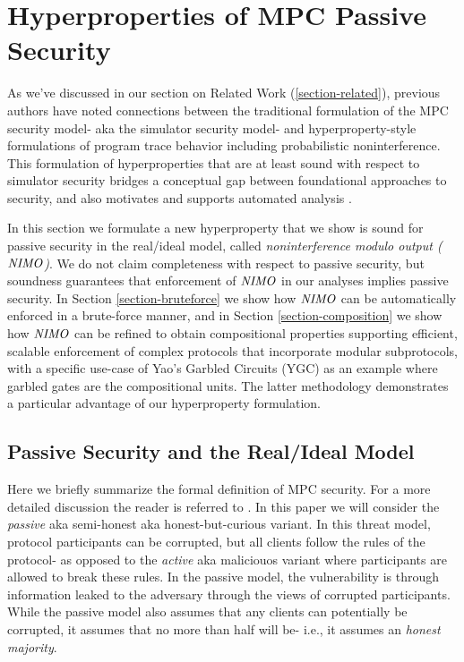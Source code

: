 \section{Hyperproperties of MPC Passive Security}

As we've discussed in our section on Related Work
(\ref{section-related}), previous authors have noted connections
between the traditional formulation of the MPC security model- aka the
simulator security model- and hyperproperty-style formulations of
program trace behavior \cite{XXX} including probabilistic
noninterference. This formulation of hyperproperties that are at least
sound with respect to simulator security bridges a conceptual gap
between foundational approaches to security, and also motivates and
supports automated analysis \cite{XXX}. 

In this section we formulate a new hyperproperty that we show is sound
for passive security in the real/ideal model, called
\emph{noninterference modulo output ($\mathit{NIMO}$)}. We do not claim
completeness with respect to passive security, but soundness
guarantees that enforcement of $\mathit{NIMO}$ in our analyses implies passive
security. In Section \ref{section-bruteforce} we show how $\mathit{NIMO}$ can
be automatically enforced in a brute-force manner, and in Section
\ref{section-composition} we show how $\mathit{NIMO}$ can be refined to obtain
compositional properties supporting efficient, scalable enforcement of
complex protocols that incorporate modular subprotocols, with a
specific use-case of Yao's Garbled Circuits (YGC) as an example where
garbled gates are the compositional units.  The latter methodology
demonstrates a particular advantage of our hyperproperty formulation.

\subsection{Passive Security and the Real/Ideal Model} Here we
briefly summarize the formal definition of MPC security. For a
more detailed discussion the reader is referred to \cite{XXX}.
In this paper we will consider the \emph{passive} aka
semi-honest aka honest-but-curious variant. In this threat
model, protocol participants can be corrupted, but all clients
follow the rules of the protocol- as opposed to the
\emph{active} aka maliciouos variant where participants
are allowed to break these rules. In the passive model, the
vulnerability is through information leaked to the adversary
through the views of corrupted participants. While the passive
model also assumes that any clients can potentially be
corrupted, it assumes that no more than half will be-
i.e., it assumes an \emph{honest majority}. 

